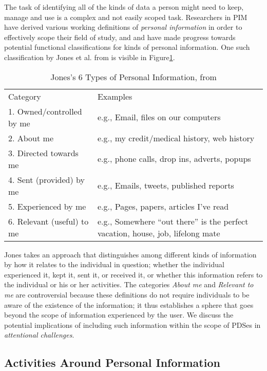 \documentclass[runningheads,a4paper]{llncs}
\begin{document}
The task of identifying all of the kinds of data a person might need to keep, manage and use is a complex and not easily scoped task.  Researchers in PIM have derived various working definitions of \emph{personal information} in order to effectively scope their field of study, and and have made progress towards potential functional classifications for kinds of personal information. One such classification by Jones et al. from \cite{kftf} is visible in Figure\ref{fig:jonestype}.

\begin{table}
\begin{tabular}{p{4cm} p{8cm}} 
Category & Examples \\
1. Owned/controlled by me & e.g., Email, files on our computers  \\
2. About me	& e.g., my credit/medical history, web history \\
3. Directed towards me & e.g., phone calls, drop ins, adverts, popups \\
4. Sent (provided) by me & e.g.,  Emails, tweets, published reports  \\
5. Experienced by me & e.g.,  Pages, papers, articles I’ve read \\
6. Relevant (useful) to me	& e.g.,  Somewhere ``out there'' is the perfect vacation, house, job, lifelong mate \\
\end{tabular}
\caption{Jones's 6 Types of Personal Information, from \cite{kftf}}
\label{fig:jonestype}
\end{table}

Jones takes an approach that distinguishes among different kinds of information by how it relates to the individual in question; whether the individual experienced it, kept it, sent it, or received it, or whether this information refers to the individual or his or her activities.  The categories \emph{About me} and \emph{Relevant to me} are controversial because these definitions do not require individuals to be aware of the existence of the information; it thus establishes a sphere that goes beyond the scope of information experienced by the user.  We discuss the potential implications of including such information within the scope of PDSes in \emph{attentional challenges}. 


\subsection{Activities Around Personal Information}
\end{document}

